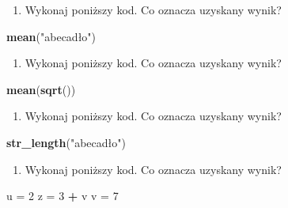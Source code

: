 \documentclass[paper=6in:9in,pagesize=pdftex,headinclude=on,footinclude=on,10pt]{scrbook}
\newenvironment{Shaded}{\begin{snugshade}}{\end{snugshade}}
\newcommand{\DecValTok}[1]{\textcolor[rgb]{0.00,0.00,0.81}{#1}}
\newcommand{\KeywordTok}[1]{\textcolor[rgb]{0.13,0.29,0.53}{\textbf{#1}}}
\newcommand{\NormalTok}[1]{#1}
\newcommand{\OperatorTok}[1]{\textcolor[rgb]{0.81,0.36,0.00}{\textbf{#1}}}
\newcommand{\StringTok}[1]{\textcolor[rgb]{0.31,0.60,0.02}{#1}}
\providecommand{\tightlist}{%
  \setlength{\itemsep}{0pt}\setlength{\parskip}{0pt}}
\begin{document}
\begin{enumerate}
\def\labelenumi{\arabic{enumi})}
\setcounter{enumi}{9}
\tightlist
\item
  Wykonaj poniższy kod.
  Co oznacza uzyskany wynik?
\end{enumerate}

\begin{Shaded}
\begin{Highlighting}[]
\KeywordTok{mean}\NormalTok{(}\StringTok{"abecadło"}\NormalTok{)}
\end{Highlighting}
\end{Shaded}

\begin{enumerate}
\def\labelenumi{\arabic{enumi})}
\setcounter{enumi}{10}
\tightlist
\item
  Wykonaj poniższy kod.
  Co oznacza uzyskany wynik?
\end{enumerate}

\begin{Shaded}
\begin{Highlighting}[]
\KeywordTok{mean}\NormalTok{(}\KeywordTok{sqrt}\NormalTok{())}
\end{Highlighting}
\end{Shaded}

\begin{enumerate}
\def\labelenumi{\arabic{enumi})}
\setcounter{enumi}{11}
\tightlist
\item
  Wykonaj poniższy kod.
  Co oznacza uzyskany wynik?
\end{enumerate}

\begin{Shaded}
\begin{Highlighting}[]
\KeywordTok{str_length}\NormalTok{(}\StringTok{"abecadło"}\NormalTok{)}
\end{Highlighting}
\end{Shaded}

\begin{enumerate}
\def\labelenumi{\arabic{enumi})}
\setcounter{enumi}{12}
\tightlist
\item
  Wykonaj poniższy kod.
  Co oznacza uzyskany wynik?
\end{enumerate}

\begin{Shaded}
\begin{Highlighting}[]
\NormalTok{u =}\StringTok{ }\DecValTok{2}
\NormalTok{z =}\StringTok{ }\DecValTok{3} \OperatorTok{+}\StringTok{ }\NormalTok{v}
\NormalTok{v =}\StringTok{ }\DecValTok{7}
\end{Highlighting}
\end{Shaded}
\end{document}
